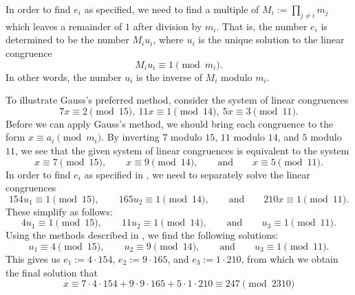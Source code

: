 In order to find $e_i$ as specified, we need to find a multiple of $M_i := \prod_{j\neq i}m_j$ which leaves a remainder of $1$ after division by $m_i$. That is, the number $e_i$ is determined to be the number $M_i u_i$, where $u_i$ is the unique solution to the linear congruence
\begin{equation*}
  M_iu_i\equiv 1\pmod{m_i}.
\end{equation*}
In other words, the number $u_i$ is the inverse of $M_i$ modulo $m_i$.

\begin{example}
  To illustrate Gauss's preferred method, consider the system of linear congruences
  \begin{equation*}
    7x\equiv 2\pmod{15},~11x\equiv 1\pmod{14},~5x\equiv 3\pmod{11}.
  \end{equation*}
  Before we can apply Gauss's method, we should bring each congruence to the form $x\equiv a_i\pmod{m_i}$. By inverting $7$ modulo $15$, $11$ modulo $14$, and $5$ modulo $11$, we see that the given system of linear congruences is equivalent to the system
  \begin{equation*}
    x\equiv 7\pmod{15},\qquad x\equiv 9\pmod{14},\qquad\text{and}\qquad x\equiv 5\pmod{11}.
  \end{equation*}
  In order to find $e_i$ as specified in , we need to separately solve the linear congruences
  \begin{equation*}
    154u_1\equiv 1\pmod{15},\qquad 165u_2\equiv 1\pmod{14},\qquad\text{and}\qquad 210x\equiv 1\pmod{11}.
  \end{equation*}
  These simplify as follows:
  \begin{equation*}
    4u_1\equiv 1\pmod{15},\qquad 11 u_2\equiv 1\pmod{14},\qquad\text{and}\qquad u_3 \equiv 1\pmod{11}.
  \end{equation*}
  Using the methods described in , we find the following solutions:
  \begin{equation*}
    u_1 \equiv 4\pmod{15},\qquad u_2\equiv 9\pmod{14},\qquad\text{and}\qquad u_3\equiv 1\pmod{11}.
  \end{equation*}
  This gives us $e_1:= 4\cdot 154$, $e_2:= 9\cdot 165$, and $e_3:= 1\cdot 210$, from which we obtain the final solution that
  \begin{equation*}
    x\equiv 7\cdot 4\cdot 154 + 9\cdot 9\cdot 165 + 5\cdot 1\cdot 210 \equiv 247 \pmod{2310}
  \end{equation*}
\end{example}

